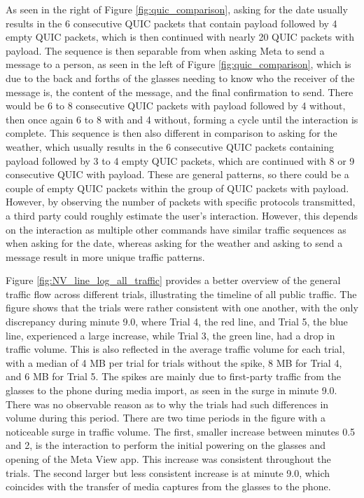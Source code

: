 As seen in the right of Figure \ref{fig:quic_comparison}, asking for the date usually results in the 6 consecutive QUIC packets that contain payload followed by 4 empty QUIC packets, which is then continued with nearly 20 QUIC packets with payload. The sequence is then separable from when asking Meta to send a message to a person, as seen in the left of Figure \ref{fig:quic_comparison}, which is due to the back and forths of the glasses needing to know who the receiver of the message is, the content of the message, and the final confirmation to send. There would be 6 to 8 consecutive QUIC packets with payload followed by 4 without, then once again 6 to 8 with and 4 without, forming a cycle until the interaction is complete. This sequence is then also different in comparison to asking for the weather, which usually results in the 6 consecutive QUIC packets containing payload followed by 3 to 4 empty QUIC packets, which are continued with 8 or 9 consecutive QUIC with payload. These are general patterns, so there could be a couple of empty QUIC packets within the group of QUIC packets with payload. However, by observing the number of packets with specific protocols transmitted, a third party could roughly estimate the user's interaction. However, this depends on the interaction as multiple other commands have similar traffic sequences as when asking for the date, whereas asking for the weather and asking to send a message result in more unique traffic patterns.


Figure \ref{fig:NV_line_log_all_traffic} provides a better overview of the general traffic flow across different trials, illustrating the timeline of all public traffic. The figure shows that the trials were rather consistent with one another, with the only discrepancy during minute 9.0, where Trial 4, the red line, and Trial 5, the blue line, experienced a large increase, while Trial 3, the green line, had a drop in traffic volume. This is also reflected in the average traffic volume for each trial, with a median of 4 MB per trial for trials without the spike, 8 MB for Trial 4, and 6 MB for Trial 5. The spikes are mainly due to first-party traffic from the glasses to the phone during media import, as seen in the surge in minute 9.0. There was no observable reason as to why the trials had such differences in volume during this period. There are two time periods in the figure with a noticeable surge in traffic volume. The first, smaller increase between minutes 0.5 and 2, is the interaction to perform the initial powering on the glasses and opening of the Meta View app. This increase was consistent throughout the trials. The second larger but less consistent increase is at minute 9.0, which coincides with the transfer of media captures from the glasses to the phone. 

